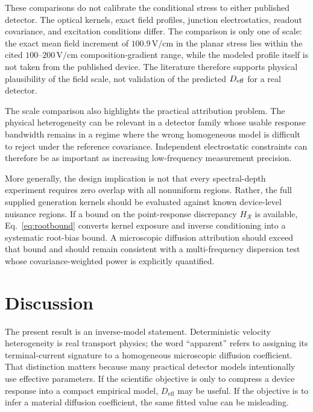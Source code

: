 \documentclass[aps,pra,twocolumn,superscriptaddress,nofootinbib]{revtex4-2}
\newcommand{\Deff}{D_{\mathrm{eff}}}
\newcommand{\Rregion}{\mathcal{R}}
\begin{document}
These comparisons do not calibrate the conditional stress to either published detector. The optical kernels, exact field profiles, junction electrostatics, readout covariance, and excitation conditions differ.  The comparison is only one of scale: the exact mean field increment of $100.9\,\mathrm{V/cm}$ in the planar stress lies within the cited $100$--$200\,\mathrm{V/cm}$ composition-gradient range, while the modeled profile itself is not taken from the published device.  The literature therefore supports physical plausibility of the field scale, not validation of the predicted $D_{\rm eff}$ for a real detector.

The scale comparison also highlights the practical attribution problem. The physical heterogeneity can be relevant in a detector family whose usable response bandwidth remains in a regime where the wrong homogeneous model is difficult to reject under the reference covariance. Independent electrostatic constraints can therefore be as important as increasing low-frequency measurement precision.

More generally, the design implication is not that every spectral-depth experiment requires zero overlap with all nonuniform regions. Rather, the full supplied generation kernels should be evaluated against known device-level nuisance regions. If a bound on the point-response discrepancy $H_{\Rregion}$ is available, Eq.~\eqref{eq:rootbound} converts kernel exposure and inverse conditioning into a systematic root-bias bound. A microscopic diffusion attribution should exceed that bound and should remain consistent with a multi-frequency dispersion test whose covariance-weighted power is explicitly quantified.

\section{Discussion}\label{sec:discussion}

The present result is an inverse-model statement. Deterministic velocity heterogeneity is real transport physics; the word ``apparent'' refers to assigning its terminal-current signature to a homogeneous microscopic diffusion coefficient. That distinction matters because many practical detector models intentionally use effective parameters. If the scientific objective is only to compress a device response into a compact empirical model, $\Deff$ may be useful. If the objective is to infer a material diffusion coefficient, the same fitted value can be misleading.
\end{document}
